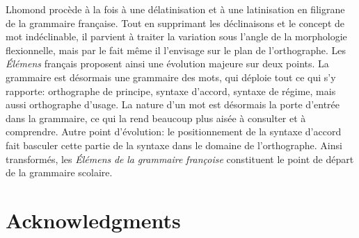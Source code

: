 \documentclass[output=paper]{langsci/langscibook}
\begin{document}
Lhomond procède à la fois à une délatinisation et à une latinisation en filigrane de la grammaire française. Tout en supprimant les déclinaisons et le concept de mot indéclinable, il parvient à traiter la variation sous l’angle de la morphologie flexionnelle, mais par le fait même il l’envisage sur le plan de l’orthographe. Les \textit{Élémens} français proposent ainsi une évolution majeure sur deux points. La grammaire est désormais une grammaire des mots, qui déploie tout ce qui s’y rapporte: orthographe de principe, syntaxe d’accord, syntaxe de régime, mais aussi orthographe d’usage. La nature d’un mot est désormais la porte d’entrée dans la grammaire, ce qui la rend beaucoup plus aisée à consulter et à comprendre. Autre point d’évolution: le positionnement de la syntaxe d’accord fait basculer cette partie de la syntaxe dans le domaine de l’orthographe. Ainsi transformés, les \textit{Élémens} \textit{de} \textit{la} \textit{grammaire} \textit{françoise} constituent le point de départ de la grammaire scolaire. 

\section*{Acknowledgments}

{\sloppy\printbibliography[heading=subbibliography,notkeyword=this]}
\end{document}
